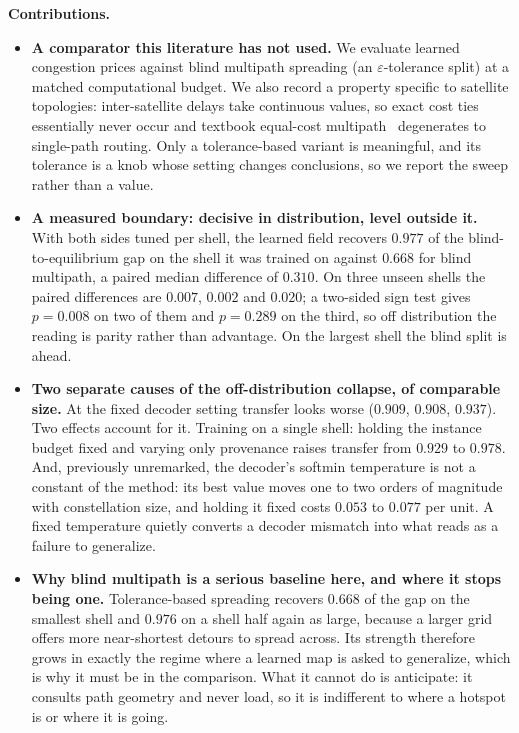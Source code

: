 \documentclass[journal]{IEEEtran}
\begin{document}
\textbf{Contributions.}
\begin{itemize}
\item \textbf{A comparator this literature has not used.} We evaluate learned congestion prices
against blind multipath spreading (an $\varepsilon$-tolerance split) at a matched computational budget. We also record a
property specific to satellite topologies: inter-satellite delays take continuous values, so
exact cost ties essentially never occur and textbook equal-cost multipath~\cite{ecmp}
degenerates to single-path routing. Only a tolerance-based variant is meaningful, and its
tolerance is a knob whose setting changes conclusions, so we report the sweep rather than a
value.

\item \textbf{A measured boundary: decisive in distribution, level outside it.} With both sides tuned per shell, the learned field recovers $0.977$ of the blind-to-equilibrium gap on the shell it was trained on against $0.668$ for blind multipath, a paired median difference of $0.310$. On three unseen shells the paired differences are $0.007$, $0.002$ and $0.020$; a two-sided sign test gives $p=0.008$ on two of them and $p=0.289$ on the third, so off distribution the reading is parity rather than advantage. On the largest shell the blind split is ahead.

\item \textbf{Two separate causes of the off-distribution collapse, of comparable size.} At the fixed decoder setting transfer looks worse ($0.909$, $0.908$, $0.937$). Two effects account for it. Training on a single shell: holding the instance budget fixed and varying only provenance raises transfer from $0.929$ to $0.978$. And, previously unremarked, the decoder's softmin temperature is not a constant of the method: its best value moves one to two orders of magnitude with constellation size, and holding it fixed costs $0.053$ to $0.077$ per unit. A fixed temperature quietly converts a decoder mismatch into what reads as a failure to generalize.

\item \textbf{Why blind multipath is a serious baseline here, and where it stops being one.}
Tolerance-based spreading recovers $0.668$ of the gap on the smallest shell and $0.976$ on a
shell half again as large, because a larger grid offers more near-shortest detours to spread
across. Its strength therefore grows in exactly the regime where a learned map is asked to
generalize, which is why it must be in the comparison. What it cannot do is anticipate: it
consults path geometry and never load, so it is indifferent to where a hotspot is or where it is
going.


\end{itemize}
\end{document}

